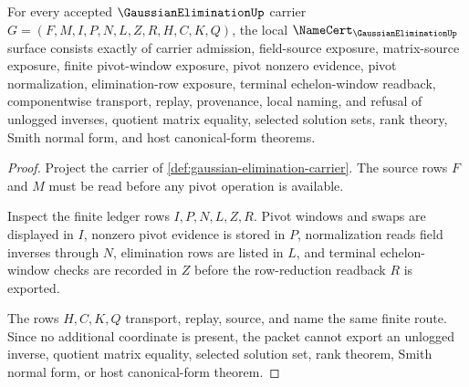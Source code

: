 \begin{theorem}
\label{thm:gaussian-elimination-namecert-obligations}
For every accepted $\GaussianEliminationUp$ carrier $G=(F,M,I,P,N,L,Z,R,H,C,K,Q)$, the local $\NameCert_{\GaussianEliminationUp}$ surface consists exactly of carrier admission, field-source exposure, matrix-source exposure, finite pivot-window exposure, pivot nonzero evidence, pivot normalization, elimination-row exposure, terminal echelon-window readback, componentwise transport, replay, provenance, local naming, and refusal of unlogged inverses, quotient matrix equality, selected solution sets, rank theory, Smith normal form, and host canonical-form theorems.
\end{theorem}
\begin{proof}
Project the carrier of \autoref{def:gaussian-elimination-carrier}. The source rows $F$ and $M$ must be read before any pivot operation is available.

Inspect the finite ledger rows $I,P,N,L,Z,R$. Pivot windows and swaps are displayed in $I$, nonzero pivot evidence is stored in $P$, normalization reads field inverses through $N$, elimination rows are listed in $L$, and terminal echelon-window checks are recorded in $Z$ before the row-reduction readback $R$ is exported.

The rows $H,C,K,Q$ transport, replay, source, and name the same finite route. Since no additional coordinate is present, the packet cannot export an unlogged inverse, quotient matrix equality, selected solution set, rank theorem, Smith normal form, or host canonical-form theorem.
\end{proof}

